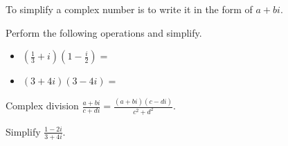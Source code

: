 \documentclass[../main.tex]{subfiles}
\begin{document}
To simplify a complex number is to write it in the form of \(a + bi\).

\begin{example} \label{ex:complex-multiply}
  Perform the following operations and simplify.

  \begin{itemize}[wide]
    \item \(\left(\frac{1}{3} + i\right)\left(1 - \frac{i}{2}\right) = \)

      
    \item \((3 + 4i)(3 - 4i) = \)


  \end{itemize}
\end{example}

\begin{definition} \label{def:complex-division}
  Complex division \(\frac{a + bi}{c + di} = \frac{(a + bi)(c-di)}{c^{2} + d^{2}}\).
\end{definition}

\begin{example} \label{ex:complex-divide}
  Simplify \(\frac{1 - 2i}{3 + 4i}\).

\end{example}
\end{document}
